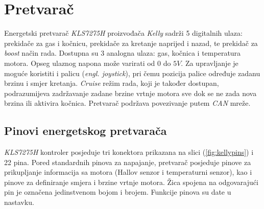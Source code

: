 \section{Pretvarač}

\qquad Energetski pretvarač \textit{KLS7275H} proizvođača \textit{Kelly} sadrži 5 digitalnih ulaza: prekidače za gas i kočnicu, prekidače za kretanje naprijed i nazad, te prekidač za \textit{boost} način rada. Dostupna su 3 analogna ulaza: gas, kočnica i temperatura motora. Opseg ulaznog napona može varirati od $0$ do $5V$. Za upravljanje je moguće koristiti i palicu (\textit{engl. joystick}), pri čemu pozicija palice određuje zadanu brzinu i smjer kretanja. \textit{Cruise} režim rada, koji je također dostupan, podrazumijeva zadržavanje zadane brzine vrtnje motora sve dok se ne zada nova brzina ili aktivira kočnica. Pretvarač podržava povezivanje putem \textit{CAN} mreže.

\subsection{Pinovi energetskog pretvarača}

\qquad \textit{KLS7275H} kontroler posjeduje tri konektora prikazana na slici (\ref{fig:kellypins}) i 22 pina. Pored standardnih pinova za napajanje, pretvarač posjeduje pinove za prikupljanje informacija sa motora (Hallov senzor i temperaturni senzor), kao i pinove za definiranje smjera i brzine vrtnje motora. Žica spojena na odgovarajući pin je označena jedinstvenom bojom i brojem. Funkcije pinova su date u nastavku.

